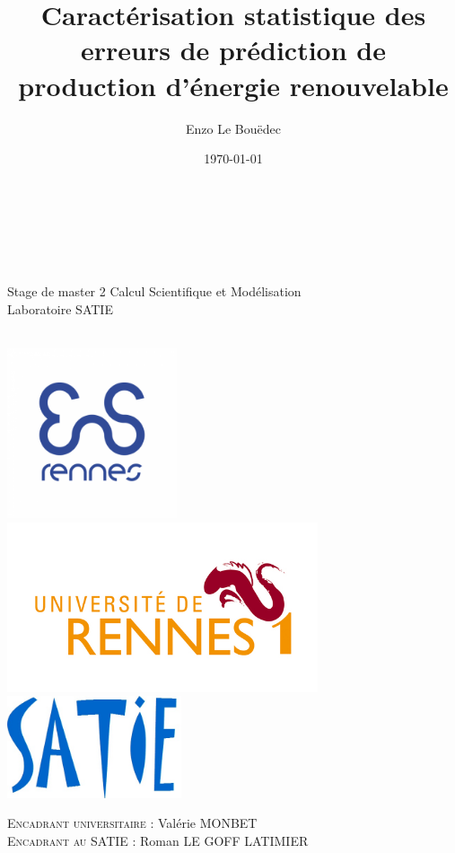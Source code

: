 \documentclass[12pt, french]{report}
\title{Caractérisation statistique des erreurs de prédiction de production d'énergie renouvelable}
\author{Enzo Le Bouëdec}
\date{\today}
\begin{document}
\makeatletter
\begin{titlepage}
	\begin{center}
		\Huge\@title \\ \vfill
		
		\hrulefill \\
		
		\Large \textsc{\@author} \\ Stage de master 2 Calcul Scientifique et Modélisation \\
		Laboratoire SATIE \\ \@date \\ \hrulefill \vfill
		
		\includegraphics[height=5cm]{Images/logos/ENS_Rennes.png}  \includegraphics[height=5cm]{Images/logos/logo_ur1.jpg} 
		\\ \vspace{1cm}
		\includegraphics[height=3cm]{Images/logos/logo_SATIE.jpg} \hfill %
		\\ \vfill
		
		\large \textsc{Encadrant universitaire} : Valérie MONBET  \\
		\textsc{Encadrant au SATIE} : Roman LE GOFF LATIMIER 
	\end{center}
\end{titlepage}
\makeatother
\end{document}
